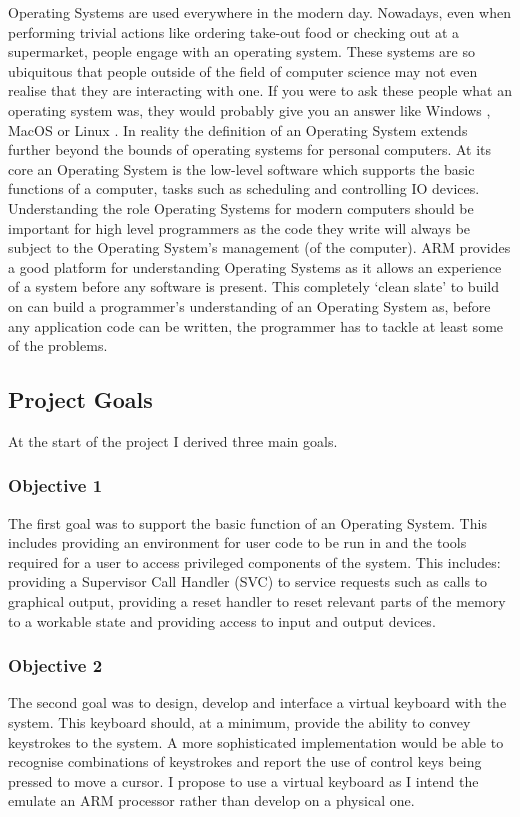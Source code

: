 Operating Systems\cite{os} are used everywhere in the modern day. Nowadays, even when performing trivial actions like ordering take-out food or checking out at a supermarket, people engage with an operating system. These systems are so ubiquitous that people outside of the field of computer science may not even realise that they are interacting with one. If you were  to ask these people what an operating system was, they would probably give you an answer like Windows \cite{windows}, MacOS \cite{apple} or Linux \cite{linux}. In reality the definition of an Operating System extends further beyond the bounds of operating systems for personal computers. At its core an Operating System is the low-level software which supports the basic functions of a computer, tasks such as scheduling and controlling IO devices. Understanding the role Operating Systems for modern computers should be important for high level programmers as the code they write will always be subject to the Operating System's management (of the computer). ARM provides a good platform for understanding Operating Systems as it allows an experience of a system before any software is present. This completely `clean slate' to build on can build a programmer's understanding of an Operating System as, before any application code can be written, the programmer has to tackle at least some of the problems. 

\subsection{Project Goals}
At the start of the project I derived three main goals.
\subsubsection{Objective 1}
\label{obj1}
The first goal was to support the basic function of an Operating System. This includes providing an environment for user code to be run in and the tools required for a user to access privileged components of the system. This includes: providing a Supervisor Call Handler (SVC) to service requests such as calls to graphical output, providing a reset handler to reset relevant parts of the memory to a workable state and providing access to input and output devices. 
\subsubsection{Objective 2}
\label{obj2}
The second goal was to design, develop and interface a virtual keyboard with the system. This keyboard should, at a minimum, provide the ability to convey keystrokes to the system. A more sophisticated implementation would be able to recognise combinations of keystrokes and report the use of control keys being pressed to move a cursor. I propose to use a virtual keyboard as I intend the emulate an ARM processor rather than develop on a physical one.
